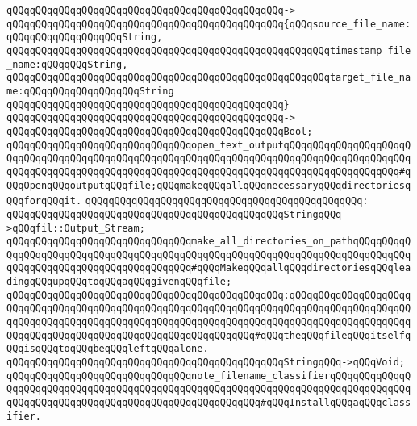 \verb|qQQqqQQqqQQqqQQqqQQqqQQqqQQqqQQqqQQqqQQqqQQqqQQq->|\newline
\verb|qQQqqQQqqQQqqQQqqQQqqQQqqQQqqQQqqQQqqQQqqQQqqQQq{qQQqsource_file_name:qQQqqQQqqQQqqQQqqQQqString,|\newline
\verb|qQQqqQQqqQQqqQQqqQQqqQQqqQQqqQQqqQQqqQQqqQQqqQQqqQQqqQQqtimestamp_file_name:qQQqqQQqString,|\newline
\verb|qQQqqQQqqQQqqQQqqQQqqQQqqQQqqQQqqQQqqQQqqQQqqQQqqQQqqQQqtarget_file_name:qQQqqQQqqQQqqQQqqQQqString|\newline
\verb|qQQqqQQqqQQqqQQqqQQqqQQqqQQqqQQqqQQqqQQqqQQqqQQq}|\newline
\verb|qQQqqQQqqQQqqQQqqQQqqQQqqQQqqQQqqQQqqQQqqQQqqQQq->|\newline
\verb|qQQqqQQqqQQqqQQqqQQqqQQqqQQqqQQqqQQqqQQqqQQqqQQqBool;|\newline
\newline
\newline
\verb|qQQqqQQqqQQqqQQqqQQqqQQqqQQqqQQqopen_text_outputqQQqqQQqqQQqqQQqqQQqqQQqqQQqqQQqqQQqqQQqqQQqqQQqqQQqqQQqqQQqqQQqqQQqqQQqqQQqqQQqqQQqqQQqqQQqqQQqqQQqqQQqqQQqqQQqqQQqqQQqqQQqqQQqqQQqqQQqqQQqqQQqqQQqqQQqqQQqqQQq#qQQqOpenqQQqoutputqQQqfile;qQQqmakeqQQqallqQQqnecessaryqQQqdirectoriesqQQqforqQQqit.|\newline
\verb|qQQqqQQqqQQqqQQqqQQqqQQqqQQqqQQqqQQqqQQqqQQqqQQq:|\newline
\verb|qQQqqQQqqQQqqQQqqQQqqQQqqQQqqQQqqQQqqQQqqQQqqQQqStringqQQq->qQQqfil::Output_Stream;|\newline
\newline
\newline
\verb|qQQqqQQqqQQqqQQqqQQqqQQqqQQqqQQqmake_all_directories_on_pathqQQqqQQqqQQqqQQqqQQqqQQqqQQqqQQqqQQqqQQqqQQqqQQqqQQqqQQqqQQqqQQqqQQqqQQqqQQqqQQqqQQqqQQqqQQqqQQqqQQqqQQqqQQqqQQq#qQQqMakeqQQqallqQQqdirectoriesqQQqleadingqQQqupqQQqtoqQQqaqQQqgivenqQQqfile;|\newline
\verb|qQQqqQQqqQQqqQQqqQQqqQQqqQQqqQQqqQQqqQQqqQQqqQQq:qQQqqQQqqQQqqQQqqQQqqQQqqQQqqQQqqQQqqQQqqQQqqQQqqQQqqQQqqQQqqQQqqQQqqQQqqQQqqQQqqQQqqQQqqQQqqQQqqQQqqQQqqQQqqQQqqQQqqQQqqQQqqQQqqQQqqQQqqQQqqQQqqQQqqQQqqQQqqQQqqQQqqQQqqQQqqQQqqQQqqQQqqQQqqQQqqQQqqQQqqQQq#qQQqtheqQQqfileqQQqitselfqQQqisqQQqtoqQQqbeqQQqleftqQQqalone.|\newline
\verb|qQQqqQQqqQQqqQQqqQQqqQQqqQQqqQQqqQQqqQQqqQQqqQQqStringqQQq->qQQqVoid;|\newline
\newline
\newline
\verb|qQQqqQQqqQQqqQQqqQQqqQQqqQQqqQQqnote_filename_classifierqQQqqQQqqQQqqQQqqQQqqQQqqQQqqQQqqQQqqQQqqQQqqQQqqQQqqQQqqQQqqQQqqQQqqQQqqQQqqQQqqQQqqQQqqQQqqQQqqQQqqQQqqQQqqQQqqQQqqQQqqQQqqQQq#qQQqInstallqQQqaqQQqclassifier.|\newline
